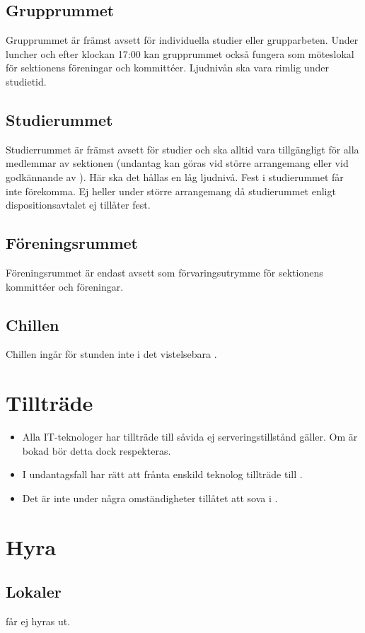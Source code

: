 \documentclass[11pt, includeaddress]{classes/cthit}
\begin{document}
\subsection{Grupprummet}
Grupprummet är främst avsett för individuella studier eller grupparbeten. Under luncher och efter klockan 17:00 kan grupprummet också fungera som möteslokal för sektionens föreningar och kommittéer. Ljudnivån ska vara rimlig under studietid.

\subsection{Studierummet}
Studierrummet är främst avsett för studier och ska alltid vara tillgängligt för alla medlemmar av sektionen (undantag kan göras vid större arrangemang eller vid godkännande av \STYRIT). Här ska det hållas en låg ljudnivå. Fest i studierummet får inte förekomma. Ej heller under större arrangemang då studierummet enligt dispositionsavtalet ej tillåter fest.

\subsection{Föreningsrummet}
Föreningsrummet är endast avsett som förvaringsutrymme för sektionens kommittéer och föreningar.

\subsection{Chillen}
Chillen ingår för stunden inte i  det vistelsebara \HUBBEN.


\section{Tillträde}
\begin{itemize}
	\item Alla IT-teknologer har tillträde till \HUBBEN såvida ej serveringstillstånd gäller. Om \HUBBEN är bokad bör detta dock respekteras.
	\item I undantagsfall har \STYRIT rätt att frånta enskild teknolog tillträde till \HUBBEN.
	\item Det är inte under några omständigheter tillåtet att sova i \HUBBEN.
\end{itemize}


\section{Hyra}
\subsection{Lokaler}
\HUBBEN får ej hyras ut.
\end{document}
